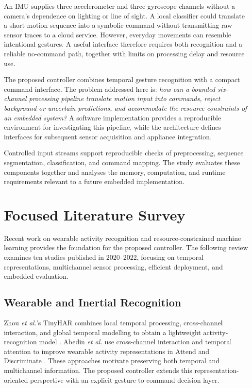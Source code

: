 \documentclass[conference]{IEEEtran}
\begin{document}
An IMU supplies three accelerometer and three gyroscope channels without a camera's dependence on lighting or line of sight. A local classifier could translate a short motion sequence into a symbolic command without transmitting raw sensor traces to a cloud service. However, everyday movements can resemble intentional gestures. A useful interface therefore requires both recognition and a reliable no-command path, together with limits on processing delay and resource use.

The proposed controller combines temporal gesture recognition with a compact command interface. The problem addressed here is: \emph{how can a bounded six-channel processing pipeline translate motion input into commands, reject background or uncertain predictions, and accommodate the resource constraints of an embedded system?} A software implementation provides a reproducible environment for investigating this pipeline, while the architecture defines interfaces for subsequent sensor acquisition and appliance integration.

Controlled input streams support reproducible checks of preprocessing, sequence segmentation, classification, and command mapping. The study evaluates these components together and analyses the memory, computation, and runtime requirements relevant to a future embedded implementation.

\section{Focused Literature Survey}
Recent work on wearable activity recognition and resource-constrained machine learning provides the foundation for the proposed controller. The following review examines ten studies published in 2020--2022, focusing on temporal representations, multichannel sensor processing, efficient deployment, and embedded evaluation.

\subsection{Wearable and Inertial Recognition}
Zhou \emph{et al.}'s TinyHAR combines local temporal processing, cross-channel interaction, and global temporal modelling to obtain a lightweight activity-recognition model \cite{tinyhar}. Abedin \emph{et al.} use cross-channel interaction and temporal attention to improve wearable activity representations in Attend and Discriminate \cite{attend}. These approaches motivate preserving both temporal and multichannel information. The proposed controller extends this representation-oriented perspective with an explicit gesture-to-command decision layer.
\end{document}

